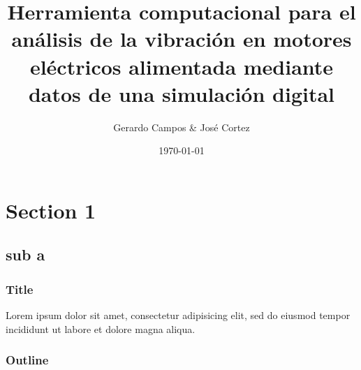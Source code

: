 \documentclass{beamer}
\title[Trabajo de grado]{Herramienta computacional para el análisis de la vibración en motores
    eléctricos alimentada mediante datos de una simulación digital}
\author[Gerardo \& José]{Gerardo Campos \& José Cortez}
\institute[UNEXPO]{Universidad Nacional Experimental Politécnica “Antonio José de Sucre”}
\date{\today}
\begin{document}
\begin{frame}
    \titlepage
\end{frame}

\section{Section 1}
\subsection{sub a}

\begin{frame}
\frametitle{Title}
Lorem ipsum dolor sit amet, consectetur adipisicing elit, sed do eiusmod tempor incididunt ut labore et dolore magna aliqua.
\end{frame}


\begin{frame}
\frametitle{Outline}
\tableofcontents
\end{frame}
\end{document}
